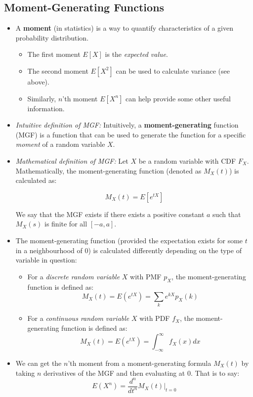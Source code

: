 \documentclass[12pt]{article}
\begin{document}
\subsection{Moment-Generating Functions}

\begin{itemize}
	\item A \textbf{moment} (in statistics) is a way to quantify characteristics of a given probability distribution.
	      \begin{itemize}
		      \item The first moment $E[X]$ is the \textit{expected value}.
		      \item The second moment $E[X^2]$ can be used to calculate variance (see above).
		      \item Similarly, $n$'th moment $E[X^n]$ can help provide some other useful information.
	      \end{itemize}
	\item \textit{Intuitive definition of MGF:} Intuitively, a
	      \textbf{moment-generating} function (MGF) is a function that can be
	      used to generate the function for a specific \textit{moment} of a
	      random variable $X$.
	\item \textit{Mathematical definition of MGF:} Let $X$ be a random variable
	      with CDF $F_X$. Mathematically, the moment-generating function (denoted
	      as $M_X(t)$) is calculated as:

	      \[
		      M_X(t) = E[e^{tX}]
	      \]

	      We say that the MGF exists if there exists a positive constant $a$
	      such that $M_X(s)$ is finite for all $[-a, a]$.

	\item The moment-generating function (provided the expectation exists for
	      some $t$ in a neighbourhood of $0$) is calculated differently depending
	      on the type of variable in question:
	      \begin{itemize}
		      \item For a \textit{discrete random variable} $X$ with PMF
		            $p_X$, the moment-generating function is defined as: \[
			            M_X(t) = E(e^{tX}) = \displaystyle\sum_{k} e^{kX}p_X(k)
		            \]
		      \item For a \textit{continuous random variable} $X$ with PDF
		            $f_X$, the moment-generating function is defined as: \[
			            M_X(t) = E(e^{tX}) = \int_{-\infty}^{\infty} f_X(x) dx
		            \]
	      \end{itemize}
	\item We can get the $n$'th moment from a moment-generating formula $M_X(t)$ by taking $n$ derivatives of the MGF and then evaluating at $0$. That is to say:
	      \[
		      E(X^n) = \frac{d^n}{dt^n} M_X(t)\Bigr\rvert_{t=0}
	      \]
\end{itemize}
\end{document}
